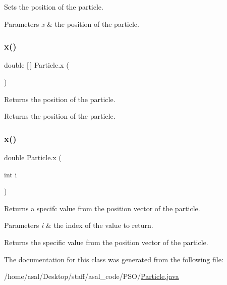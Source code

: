 Sets the position of the particle. 
\begin{DoxyParams}{Parameters}
{\em x} & the position of the particle. \\
\hline
\end{DoxyParams}
\mbox{\label{class_particle_a4ae274d487a3565fa11d59206c45139d}} 
\subsubsection{\texorpdfstring{x()}{x()}\hspace{0.1cm}{\footnotesize\ttfamily [2/3]}}
{\footnotesize\ttfamily double \mbox{[}$\,$\mbox{]} Particle.\+x (\begin{DoxyParamCaption}{ }\end{DoxyParamCaption})}

Returns the position of the particle. \begin{DoxyReturn}{Returns}
the position of the particle. 
\end{DoxyReturn}
\mbox{\label{class_particle_a1298e71228d20427caf49481cd1d0fdf}} 
\subsubsection{\texorpdfstring{x()}{x()}\hspace{0.1cm}{\footnotesize\ttfamily [3/3]}}
{\footnotesize\ttfamily double Particle.\+x (\begin{DoxyParamCaption}\item[{int}]{i }\end{DoxyParamCaption})}

Returns a specifc value from the position vector of the particle. 
\begin{DoxyParams}{Parameters}
{\em i} & the index of the value to return. \\
\hline
\end{DoxyParams}
\begin{DoxyReturn}{Returns}
the specific value from the position vector of the particle. 
\end{DoxyReturn}


The documentation for this class was generated from the following file\+:\begin{DoxyCompactItemize}
\item 
/home/asal/\+Desktop/staff/asal\+\_\+code/\+P\+S\+O/\hyperlink{_particle_8java}{Particle.\+java}\end{DoxyCompactItemize}
